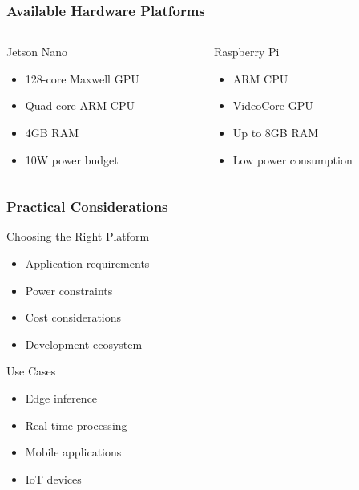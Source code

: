 \documentclass{beamer}
\begin{document}
\begin{frame}
    \frametitle{Available Hardware Platforms}
    \begin{columns}[T]
        \begin{column}{0.45\textwidth}
            \begin{block}{Jetson Nano}
                \begin{itemize}
                    \item 128-core Maxwell GPU
                    \item Quad-core ARM CPU
                    \item 4GB RAM
                    \item 10W power budget
                \end{itemize}
            \end{block}
        \end{column}
        
        \begin{column}{0.45\textwidth}
            \begin{block}{Raspberry Pi}
                \begin{itemize}
                    \item ARM CPU
                    \item VideoCore GPU
                    \item Up to 8GB RAM
                    \item Low power consumption
                \end{itemize}
            \end{block}
        \end{column}
    \end{columns}
\end{frame}

\begin{frame}
    \frametitle{Practical Considerations}
    \begin{block}{Choosing the Right Platform}
        \begin{itemize}
            \item Application requirements
            \item Power constraints
            \item Cost considerations
            \item Development ecosystem
        \end{itemize}
    \end{block}
    
    \begin{exampleblock}{Use Cases}
        \begin{itemize}
            \item Edge inference
            \item Real-time processing
            \item Mobile applications
            \item IoT devices
        \end{itemize}
    \end{exampleblock}
\end{frame}
\end{document}
